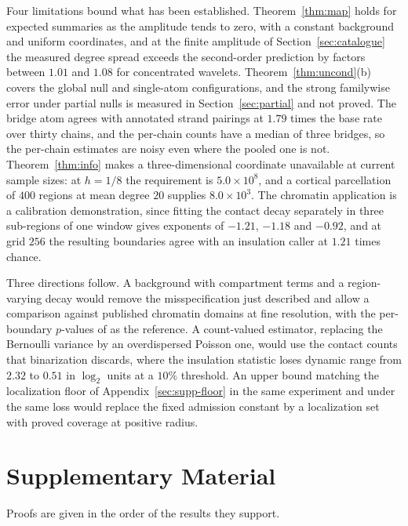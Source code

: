 \documentclass[11pt]{article}
\theoremstyle{definition}
\newcommand{\1}{\mathbf 1}\newcommand{\op}{\operatorname}
\begin{document}
Four limitations bound what has been established.  Theorem~\ref{thm:map}
holds for expected summaries as the amplitude tends to zero, with a constant
background and uniform coordinates, and at the finite amplitude of
Section~\ref{sec:catalogue} the measured degree spread exceeds the second-order
prediction by factors between $1.01$ and $1.08$ for concentrated wavelets.
Theorem~\ref{thm:uncond}(b) covers the global null and single-atom
configurations, and the strong familywise error under partial nulls is
measured in Section~\ref{sec:partial} and not proved.  The bridge atom agrees with
annotated strand pairings at $1.79$ times the base rate over thirty chains,
and the per-chain counts have a median of three bridges, so the per-chain
estimates are noisy even where the pooled one is not.  Theorem~\ref{thm:info}
makes a three-dimensional coordinate unavailable at current sample sizes: at
$h=1/8$ the requirement is $5.0\times10^{8}$, and a cortical parcellation of
$400$ regions at mean degree $20$ supplies $8.0\times10^{3}$.  The chromatin
application is a calibration demonstration, since fitting the contact decay
separately in three sub-regions of one window gives exponents of $-1.21$,
$-1.18$ and $-0.92$, and at grid $256$ the resulting boundaries agree with an
insulation caller at $1.21$ times chance.

Three directions follow.  A background with compartment terms and a
region-varying decay would remove the misspecification just described and
allow a comparison against published chromatin domains at fine resolution,
with the per-boundary $p$-values of \citet{xing2021} as the reference.  A
count-valued estimator, replacing the Bernoulli variance by an overdispersed
Poisson one, would use the contact counts that binarization discards, where
the insulation statistic loses dynamic range from $2.32$ to $0.51$ in $\log_2$
units at a $10\%$ threshold.  An upper bound matching the localization floor
of Appendix~\ref{sec:supp-floor} in the same experiment and under the same
loss would replace the fixed admission constant by a localization set with
proved coverage at positive radius.







\clearpage
\appendix
\section*{Supplementary Material}

Proofs are given in the order of the results they support.
\end{document}
